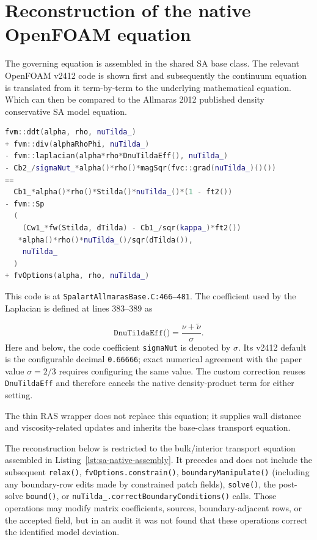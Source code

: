 \documentclass[11pt]{article}
\newcommand{\SAcode}[1]{\texttt{#1}}
\newcommand{\SAOF}{OpenFOAM}
\begin{document}
\section{Reconstruction of the native OpenFOAM equation}
\label{sec:sa-native-reconstruction}

The governing equation is assembled in the shared SA base class.  The relevant
\SAOF{} v2412 code is shown first and subsequently the continuum equation is translated from it term-by-term to the underlying mathematical equation. Which can then be compared to the Allmaras 2012 published density conservative SA model equation. 
\begin{lstlisting}[style=SAFoam,language=C++,firstnumber=468,
  caption={Native SA equation assembly in SpalartAllmarasBase.C.},
  label={lst:sa-native-assembly}]
fvm::ddt(alpha, rho, nuTilda_)
+ fvm::div(alphaRhoPhi, nuTilda_)
- fvm::laplacian(alpha*rho*DnuTildaEff(), nuTilda_)
- Cb2_/sigmaNut_*alpha()*rho()*magSqr(fvc::grad(nuTilda_)()())
==
  Cb1_*alpha()*rho()*Stilda()*nuTilda_()*(1 - ft2())
- fvm::Sp
  (
    (Cw1_*fw(Stilda, dTilda) - Cb1_/sqr(kappa_)*ft2())
   *alpha()*rho()*nuTilda_()/sqr(dTilda()),
    nuTilda_
  )
+ fvOptions(alpha, rho, nuTilda_)
\end{lstlisting}
This code is at
\SAcode{SpalartAllmarasBase.C:466--481}.  The coefficient used by the
Laplacian is defined at lines 383--389 as\par
\begin{equation}
  \SAcode{DnuTildaEff()}
  =\frac{\nu+\widetilde{\nu}}{\sigma}.
  \label{eq:sa-effective-diffusivity}
\end{equation}
Here and below, the code coefficient \SAcode{sigmaNut} is denoted by
\(\sigma\).  Its v2412 default is the configurable decimal
\SAcode{0.66666}; exact numerical agreement with the paper value
\(\sigma=2/3\) requires configuring the same value.  The custom correction
reuses \SAcode{DnuTildaEff} and therefore cancels the native density-product
term for either setting.

The thin RAS wrapper does not replace this equation; it supplies wall distance
and viscosity-related updates and inherits the base-class transport equation.

The reconstruction below is restricted to the bulk/interior transport
equation assembled in Listing~\ref{lst:sa-native-assembly}.  It precedes and
does not include the subsequent \SAcode{relax()},
\SAcode{fvOptions.constrain()}, \SAcode{boundaryManipulate()} (including any
boundary-row edits made by constrained patch fields), \SAcode{solve()}, the
post-solve \SAcode{bound()}, or
\SAcode{nuTilda\_.correctBoundaryConditions()} calls.  Those operations may
modify matrix coefficients, sources, boundary-adjacent rows, or the accepted
field, but in an audit it was not found that these operations correct the identified model deviation.
\end{document}
